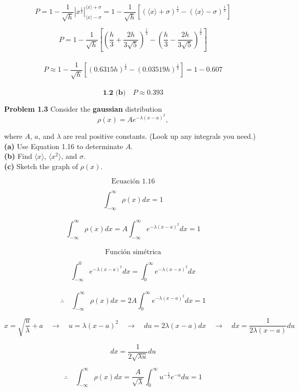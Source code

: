 \documentclass[10pt,a4papper]{article}
\begin{document}
\[P=
1-\frac{1}{\sqrt{h}}\left|x^{\frac{1}{2}}\right|_{\langle x\rangle-\sigma}^{\langle x\rangle+\sigma}=
1-\frac{1}{\sqrt{h}}\left[(\langle x\rangle+\sigma)^{\frac{1}{2}}-(\langle x\rangle-\sigma)^{\frac{1}{2}}\right]\]

\[P=1-\frac{1}{\sqrt{h}}\left[\left(\frac{h}{3}+\frac{2h}{3\sqrt{5}}\right)^{\frac{1}{2}}-\left(\frac{h}{3}-\frac{2h}{3\sqrt{5}}\right)^{\frac{1}{2}}\right]\]\\

\[P\approx 1-\frac{1}{\sqrt{h}}\left[(0.6315h)^\frac{1}{2}-(0.03519h)^\frac{1}{2}\right]=1-0.607\]\\

\[\boxed{\textbf{1.2 (b)}\quad P\approx 0.393}\]

\newpage
\textbf{Problem 1.3} Consider the \textbf{gaussian} distribution\\

\[\rho(x)=Ae^{-\lambda(x-a)^2},\]

where $A$, $a$, and $\lambda$ are real positive constants. (Look up any integrals you
need.)\\

\textbf{(a)} Use Equation 1.16 to determinate $A$.\\
\textbf{(b)} Find $\langle x\rangle$, $\langle x^2\rangle$, and $\sigma$.\\
\textbf{(c)} Sketch the graph of $\rho(x)$.

\newpage
\[\text{Ecuación 1.16}\]

\[\int_{-\infty}^\infty\rho(x)dx=1\]\\

\[\int_{-\infty}^\infty\rho(x)dx=A\int_{-\infty}^\infty e^{-\lambda(x-a)^2}dx=1\]\\

\[\text{Función simétrica}\]

\[\int_{-\infty}^0 e^{-\lambda(x-a)^2}dx=\int_0^\infty e^{-\lambda(x-a)^2}dx\]\\

\[\therefore\quad\int_{-\infty}^\infty\rho(x)dx=2A\int_0^\infty e^{-\lambda(x-a)^2}dx=1\]

\[x=\sqrt{\frac{u}{\lambda}}+a\quad\to\quad u=\lambda(x-a)^2\quad\to\quad du=2\lambda(x-a)dx\quad\to\quad dx=\frac{1}{2\lambda(x-a)}du\]

\[dx=\frac{1}{2\sqrt{\lambda u}}du\]

\[\therefore\quad\int_{-\infty}^\infty\rho(x)dx=\frac{A}{\sqrt{\lambda}}\int_0^\infty u^{-\frac{1}{2}}e^{-u}du=1\]\\
\end{document}
